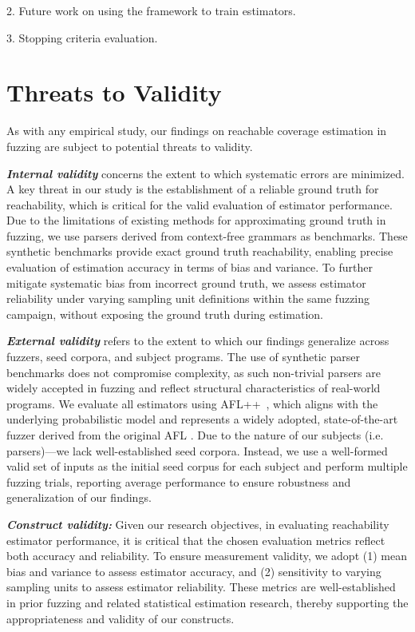 \documentclass[conference,anonymous,review]{IEEEtran}
\begin{document}
2. Future work on using the framework to train estimators.

3. Stopping criteria evaluation.

\section{Threats to Validity}\label{sec:threats}

As with any empirical study, our findings on reachable coverage estimation in fuzzing are subject to potential threats to validity.

\emph{\textbf{Internal validity}} concerns the extent to which systematic errors are minimized. A key threat in our study is the establishment of a reliable ground truth for reachability, which is critical for the valid evaluation of estimator performance. Due to the limitations of existing methods for approximating ground truth in fuzzing, we use parsers derived from context-free grammars as benchmarks. These synthetic benchmarks provide exact ground truth reachability, enabling precise evaluation of estimation accuracy in terms of bias and variance. To further mitigate systematic bias from incorrect ground truth, we assess estimator reliability under varying sampling unit definitions within the same fuzzing campaign, without exposing the ground truth during estimation.

\emph{\textbf{External validity}} refers to the extent to which our findings generalize across fuzzers, seed corpora, and subject programs. The use of synthetic parser benchmarks does not compromise complexity, as such non-trivial parsers are widely accepted in fuzzing \cite{lee2022fuzzle} and reflect structural characteristics of real-world programs. We evaluate all estimators using AFL++~\cite{fioraldi2020AFL++}, which aligns with the underlying probabilistic model and represents a widely adopted, state-of-the-art fuzzer derived from the original AFL \cite{zalewski2017american}. Due to the nature of our subjects (i.e. parsers)—we lack well-established seed corpora. Instead, we use a well-formed valid set of inputs as the initial seed corpus for each subject and perform multiple fuzzing trials, reporting average performance to ensure robustness and generalization of our findings.

\emph{\textbf{Construct validity:}} Given our research objectives, in evaluating reachability estimator performance, it is critical that the chosen evaluation metrics reflect both accuracy and reliability. To ensure measurement validity, we adopt (1) mean bias and variance to assess estimator accuracy, and (2) sensitivity to varying sampling units to assess estimator reliability. These metrics are well-established in prior fuzzing and related statistical estimation research, thereby supporting the appropriateness and validity of our constructs.
\end{document}
